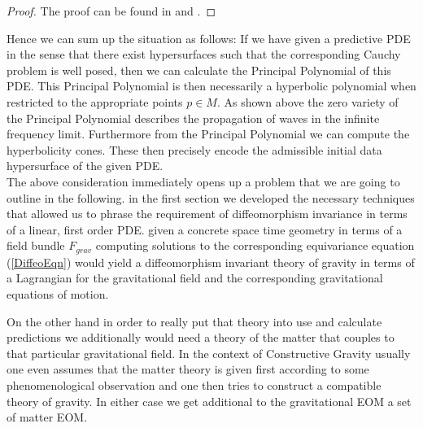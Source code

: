 \documentclass[a4paper,12pt, DIV=14, BCOR=5mm, twoside, headsepline, numbers=noenddot]{scrbook}
\begin{document}
\begin{proof}
The proof can be found in \cite{Hormander1977} and \cite{Ivrii_1974}.
\end{proof}
Hence we can sum up the situation as follows: If we have given a predictive PDE in the sense that there exist hypersurfaces such that the corresponding Cauchy problem is well posed, then we can calculate the Principal Polynomial of this PDE. This Principal Polynomial is then necessarily a hyperbolic polynomial when restricted to the appropriate points $p \in M$. As shown above the zero variety of the Principal Polynomial describes the propagation of waves in the infinite frequency limit. Furthermore from the Principal Polynomial we can compute the hyperbolicity cones. These then precisely encode the admissible initial data hypersurface of the given PDE.\\ 

The above consideration immediately opens up a problem that we are going to outline in the following. in the first section we developed the necessary techniques that allowed us to phrase the requirement of diffeomorphism invariance in terms of a linear, first order PDE. given a concrete space time geometry in terms of a field bundle $F_{grav}$ computing solutions to the corresponding equivariance equation (\ref{DiffeoEqn}) would yield a diffeomorphism invariant theory of gravity in terms of a Lagrangian for the gravitational field and the corresponding gravitational equations of motion.  

On the other hand in order to really put that theory into use and calculate predictions we additionally would need a theory of the matter that couples to that particular gravitational field. In the context of Constructive Gravity usually one even assumes that the matter theory is given first according to some phenomenological observation and one then tries to construct a compatible theory of gravity. In either case we get additional to the gravitational EOM a set of matter EOM.
\end{document}
